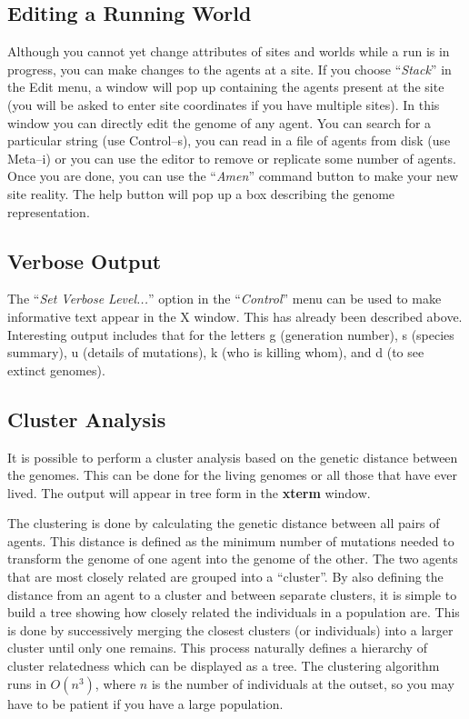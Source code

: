 \subsection{Editing a Running World}

Although you cannot yet change attributes of sites and worlds while a
run is in progress, you can make changes to the agents at a site. If
you choose ``{\sl Stack}''  in the Edit menu, a window
will pop up containing the agents present at the site (you will be
asked to enter site coordinates if you have multiple sites). In this
window you can directly edit the genome of any agent. You can search
for a particular string (use Control--s), you can read in a file of
agents from disk (use Meta--i) or you can use the editor to remove or
replicate some number of agents. Once you are done, you can use the
``{\sl Amen}'' command button to make your new site reality. The help
button will pop up a box describing the genome representation.

\subsection{Verbose Output}

The ``{\sl Set Verbose Level...}''  option in the
``{\sl Control}'' menu  can be used to make
informative text appear in the X window. This has already been
described above. Interesting output includes that for the letters {\sf
g} (generation number),  {\sf s} (species
summary),  {\sf u} (details of mutations),
 {\sf k} (who is killing whom), and {\sf d} (to see
extinct genomes).  

\subsection{Cluster Analysis}
\label{cluster-analysis}

It is possible to perform a cluster analysis based on the genetic
distance between the genomes. This can be done for the living genomes
or all those that have ever lived. The output will appear in tree
form in the {\bf xterm} window.

The clustering is done by calculating the genetic distance between all
pairs of agents. This distance is defined as the minimum number of
mutations needed to transform the genome of one agent into the genome
of the other. The two agents that are most closely related are grouped
into a ``cluster''. By also defining the distance from an agent to a
cluster and between separate clusters, it is simple to build a tree
showing how closely related the individuals in a population are. This
is done by successively merging the closest clusters (or individuals)
into a larger cluster until only one remains. This process naturally
defines a hierarchy of cluster relatedness which can be displayed as a
tree.  The clustering algorithm runs in $O(n^3 )$, where $n$ is the
number of individuals at the outset, so you may have to be patient if
you have a large population.


